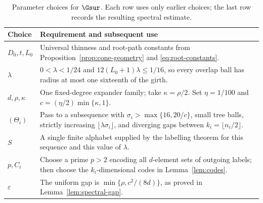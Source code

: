 \begin{table}[ht]
\centering
\small
\begin{tabular}{@{}ll@{}}
\toprule
Choice & Requirement and subsequent use \\
\midrule
$D_0,t,L_0$ & Universal thinness and root-path constants from
Proposition~\ref{prop:cone-geometry} and \eqref{eq:root-constants}.\\
$\lambda$ & $0<\lambda<1/24$ and
$12(L_0+1)\lambda\le1/16$, so every overlap ball has radius at most
one sixteenth of the girth.\\
$d,\rho,\kappa$ & One fixed-degree expander family; take
$\kappa=\rho/2$. Set $\eta=1/100$ and
$c=(\eta/2)\min\{\kappa,1\}$.\\
$(\Theta_i)$ & Pass to a subsequence with
$\sigma_i>\max\{16,20/c\}$, small tree balls, strictly increasing
$\lfloor\lambda\sigma_i\rfloor$, and diverging gaps between
$k_i=\lfloor n_i/2\rfloor$.\\
$S$ & A single finite alphabet supplied by the labelling theorem for
this sequence and this value of $\lambda$.\\
$p,C_i$ & Choose a prime $p>2$ encoding all $d$-element sets of outgoing labels;
then choose the $k_i$-dimensional codes in Lemma~\ref{lem:codes}.\\
$\varepsilon$ & The uniform gap is
$\min\{\rho,c^2/(8d)\}$, as proved in
Lemma~\ref{lem:spectral-gap}.\\
\bottomrule
\end{tabular}
\caption{Parameter choices for $\Gsur$. Each row uses only earlier
choices; the last row records the resulting spectral estimate.}
\label{tab:parameters}
\end{table}
